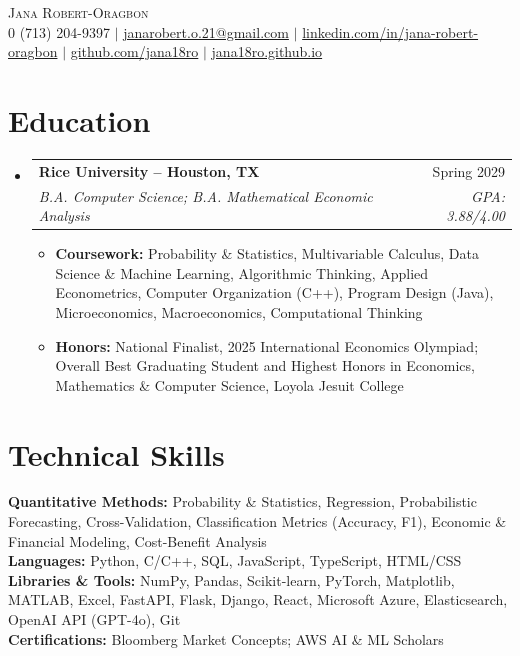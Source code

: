 \documentclass[letterpaper,10pt]{article}
\makeatletter
\providecommand{\public}{0}
\newcommand{\resumeItem}[1]{\item\small{#1\vspace{-2pt}}}
\newcommand{\resumeSubheading}[4]{
  \vspace{-2pt}\item
  \begin{tabular*}{\textwidth}[t]{l@{\extracolsep{\fill}}r}
    \textbf{#1} & \small #2 \\
    \textit{\small #3} & \textit{\small #4} \\
  \end{tabular*}\vspace{-7pt}
}
\newcommand{\resumeSubHeadingListStart}{\begin{itemize}[leftmargin=0.0in, label={}]}
\newcommand{\resumeSubHeadingListEnd}{\end{itemize}}
\newcommand{\resumeItemListStart}{\begin{itemize}[leftmargin=0.18in]}
\newcommand{\resumeItemListEnd}{\end{itemize}\vspace{-5pt}}
\makeatother
\begin{document}
\begin{center}
  {\Huge \scshape Jana Robert-Oragbon} \\ \vspace{3pt}
  \small
  \if\public0 (713) 204-9397 $|$ \fi
  \href{mailto:janarobert.o.21@gmail.com}{janarobert.o.21@gmail.com} $|$
  \href{https://www.linkedin.com/in/jana-robert-oragbon}{linkedin.com/in/jana-robert-oragbon} $|$
  \href{https://github.com/jana18ro}{github.com/jana18ro} $|$
  \href{https://jana18ro.github.io}{jana18ro.github.io}
\end{center}

\section{Education}
\resumeSubHeadingListStart
  \resumeSubheading
    {Rice University -- Houston, TX}{Spring 2029}
    {B.A. Computer Science; B.A. Mathematical Economic Analysis}{GPA: 3.88/4.00}
    \resumeItemListStart
      \resumeItem{\textbf{Coursework:} Probability \& Statistics, Multivariable Calculus, Data Science \& Machine Learning, Algorithmic Thinking, Applied
        Econometrics, Computer Organization (C++), Program Design (Java), Microeconomics, Macroeconomics, Computational Thinking}
      \resumeItem{\textbf{Honors:} National Finalist, 2025 International Economics Olympiad; Overall Best Graduating Student and Highest Honors in
        Economics, Mathematics \& Computer Science, Loyola Jesuit College}
    \resumeItemListEnd
\resumeSubHeadingListEnd

\section{Technical Skills}
\begin{itemize}[leftmargin=0.0in, label={}]
  \small{\item{
    \textbf{Quantitative Methods:} Probability \& Statistics, Regression, Probabilistic Forecasting, Cross-Validation, Classification Metrics
      (Accuracy, F1), Economic \& Financial Modeling, Cost-Benefit Analysis \\
    \textbf{Languages:} Python, C/C++, SQL, JavaScript, TypeScript, HTML/CSS \\
    \textbf{Libraries \& Tools:} NumPy, Pandas, Scikit-learn, PyTorch, Matplotlib, MATLAB, Excel, FastAPI, Flask, Django, React, Microsoft
      Azure, Elasticsearch, OpenAI API (GPT-4o), Git \\
    \textbf{Certifications:} Bloomberg Market Concepts; AWS AI \& ML Scholars
  }}
\end{itemize}
\vspace{-12pt}
\end{document}
